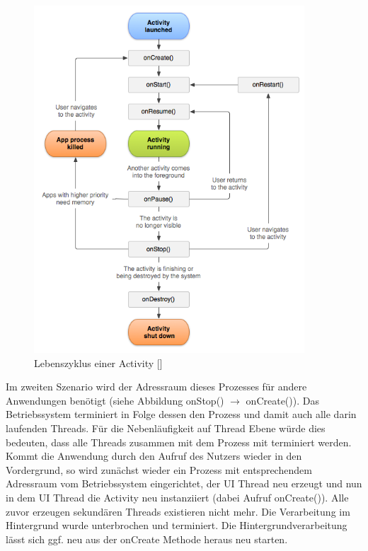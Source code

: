 \documentclass[12pt,oneside,a4paper,bibtotoc,liststotoc]{scrreprt}
\begin{document}
\begin{figure}[H]
  \begin{centering}
    \includegraphics[width=0.9\textwidth]{img/activity_lifecycle.png}
    \caption{Lebenszyklus einer Activity [\citet{androidDevDocu}]}
    \label{Activity_Lifecycle}
  \end{centering}
\end{figure}
Im zweiten Szenario wird der Adressraum dieses Prozesses für andere Anwendungen benötigt (siehe Abbildung onStop() $\rightarrow$  onCreate()). Das Betriebssystem terminiert in Folge dessen den Prozess und damit auch alle darin laufenden Threads. Für die Nebenläufigkeit auf Thread Ebene würde dies bedeuten, dass alle Threads zusammen mit dem Prozess mit terminiert werden. Kommt die Anwendung durch den Aufruf des Nutzers wieder in den Vordergrund, so wird zunächst wieder ein Prozess mit entsprechendem Adressraum vom Betriebssystem eingerichtet, der UI Thread neu erzeugt und nun in dem UI Thread die Activity neu instanziiert (dabei Aufruf onCreate()). Alle zuvor erzeugen sekundären Threads existieren nicht mehr. Die Verarbeitung im Hintergrund wurde unterbrochen und terminiert. Die Hintergrundverarbeitung lässt sich ggf. neu aus der onCreate Methode heraus neu starten.
\end{document}
